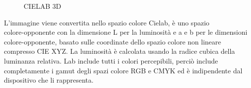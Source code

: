 \documentclass[a4paper,12pt]{report}
\begin{document}
\begin{figure}
\begin{minipage}{0.35\textwidth}
          \caption{CIELAB 3D}
        \end{minipage}
      \end{figure}

      L'immagine viene convertita nello spazio colore Cielab, è uno spazio \\
      colore-opponente con la dimensione L per la luminosità e a e b per le dimensioni colore-opponente,
      basato sulle coordinate dello spazio colore non lineare compresso CIE XYZ.
      La luminosità è calcolata usando la radice cubica della luminanza relativa. 
      Lab include tutti i colori percepibili, perciò include completamente i gamut degli 
      spazi colore RGB e CMYK ed è indipendente dal dispositivo che li rappresenta.
      
      \begin{figure}
        \centering
        

\end{figure}
\end{document}
